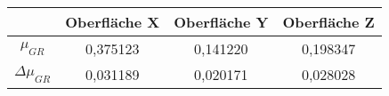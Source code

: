 \begin{tabular}{c|c|c|c}
    \space & Oberfläche X & Oberfläche Y & Oberfläche Z \\ \hline
    $\mu_{GR}$ & 0,375123 & 0,141220 & 0,198347 \\
    $\Delta \mu_{GR}$ & 0,031189 & 0,020171 & 0,028028
\end{tabular}